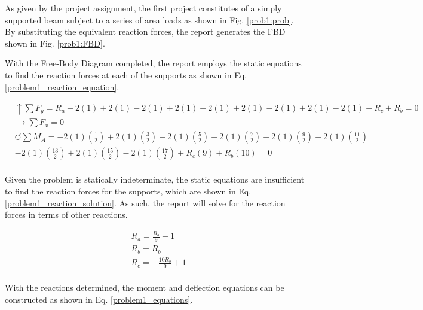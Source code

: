 \documentclass[a4paper]{article}
\begin{document}
As given by the project assignment, the first project constitutes of a simply supported beam subject to a series of area loads as shown in Fig. \ref{prob1:prob}. By substituting the equivalent reaction forces, the report generates the FBD shown in Fig. \ref{prob1:FBD}.


With the Free-Body Diagram completed, the report employs the static equations to find the reaction forces at each of the supports as shown in Eq. \ref{problem1_reaction_equation}.

\begin{equation}
\begin{split}
	&\uparrow \sum F_y = R_a - 2(1) + 2(1) - 2(1) + 2(1) - 2(1) + 2(1) - 2(1) + 2(1) - 2(1) + R_c + R_b = 0 \\
 	&\rightarrow \sum F_x = 0 \\
 	&\circlearrowleft \sum M_A = -2(1)\left(\frac{1}{2}\right) + 2(1)\left(\frac{3}{2}\right) - 2(1)\left(\frac{5}{2}\right) + 2(1)\left(\frac{7}{2}\right) - 2(1)\left(\frac{9}{2}\right) + 2(1)\left(\frac{11}{2}\right) \\ 
	& - 2(1)\left(\frac{13}{2}\right) + 2(1)\left(\frac{15}{2}\right) - 2(1)\left(\frac{17}{2}\right)  + R_c(9) + R_b(10) = 0 \\
\end{split}
\label{problem1_reaction_equation}
\end{equation}

Given the problem is statically indeterminate, the static equations are insufficient to find the reaction forces for the supports, which are shown in Eq. \ref{problem1_reaction_solution}. As such, the report will solve for the reaction forces in terms of other reactions.

\begin{equation}
\begin{split}
	& R_a = \frac{R_b}{9} + 1 \\
	& R_b = R_b \\
	& R_c = -\frac{10R_b}{9} + 1 \\
\end{split}
\label{problem1_reaction_solution}
\end{equation}

With the reactions determined, the moment and deflection equations can be constructed as shown in Eq. \ref{problem1_equations}.
\end{document}
